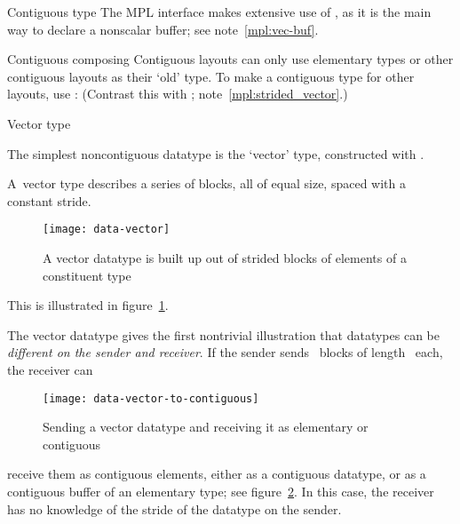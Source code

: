 


\begin{mplnote}{Contiguous type}
  The \ac{MPL} interface makes extensive use of
  ,
  as it is the main way to declare a nonscalar buffer;
  see note~\ref{mpl:vec-buf}.
\end{mplnote}

\begin{mplnote}{Contiguous composing}
  \label{mpl:cont_vector}
  Contiguous layouts can only use elementary types or other contiguous layouts
  as their `old' type.
  To make a contiguous type for other layouts, use :
  (Contrast this with ; note~\ref{mpl:strided_vector}.)
\end{mplnote}

 {Vector type}
\label{sec:data:vector}

The simplest noncontiguous datatype is the `vector' type, constructed with
.

A~vector type describes a series of blocks, all 
of equal size, spaced with a constant stride.
\begin{figure}[t]
  \texttt{[image: data-vector]}
  \caption{A vector datatype is built up out of strided blocks of elements of a constituent type}
  \label{fig:data-vector}
\end{figure}
This is illustrated in figure~\ref{fig:data-vector}.

The vector datatype gives the first nontrivial illustration that
datatypes can be \emph{different on the sender and
  receiver}. If the
sender sends ~blocks of length~ each, the receiver can
%
\begin{figure}[t]
  \texttt{[image: data-vector-to-contiguous]}
  \caption{Sending a vector datatype and receiving it as elementary or
    contiguous}
  \label{fig:data-vector-to-contiguous}
\end{figure}
%
receive them as  contiguous elements, either as a contiguous
datatype, or as a contiguous buffer of an elementary type; see
figure~\ref{fig:data-vector-to-contiguous}. In this case, the receiver
has no knowledge of the stride of the datatype on the sender.

